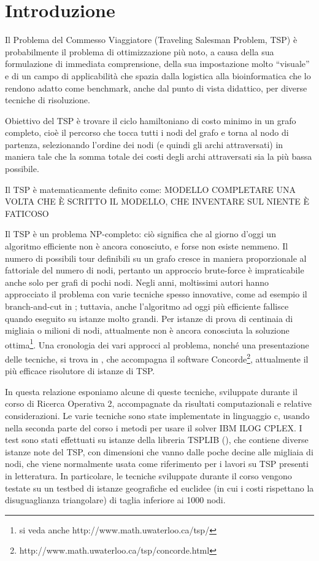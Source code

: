 \chapter{Introduzione}
Il Problema del Commesso Viaggiatore (Traveling Salesman Problem, TSP) è probabilmente il problema di ottimizzazione più noto, a causa della sua formulazione di immediata comprensione, della sua impostazione molto ``visuale'' e di un campo di applicabilità che spazia dalla logistica alla bioinformatica che lo rendono adatto come benchmark, anche dal punto di vista didattico, per diverse tecniche di risoluzione.

Obiettivo del TSP è trovare il ciclo hamiltoniano di costo minimo in un grafo completo, cioè il percorso che tocca tutti i nodi del grafo e torna al nodo di partenza, selezionando l'ordine dei nodi (e quindi gli archi attraversati) in maniera tale che la somma totale dei costi degli archi attraversati sia la più bassa possibile.

Il TSP è matematicamente definito come:
MODELLO
COMPLETARE UNA VOLTA CHE È SCRITTO IL MODELLO, CHE INVENTARE SUL NIENTE È FATICOSO

Il TSP è un problema NP-completo: ciò significa che al giorno d'oggi un algoritmo efficiente non è ancora conosciuto, e forse non esiste nemmeno. Il numero di possibili tour definibili su un grafo cresce in maniera proporzionale al fattoriale del numero di nodi, pertanto un approccio brute-force è impraticabile anche solo per grafi di pochi nodi. Negli anni, moltissimi autori hanno approcciato il problema con varie tecniche spesso innovative, come ad esempio il branch-and-cut in \citet*{padberg1991branch}; tuttavia, anche l'algoritmo ad oggi più efficiente fallisce quando eseguito su istanze molto grandi. Per istanze di prova di centinaia di migliaia o milioni di nodi, attualmente non è ancora conosciuta la soluzione ottima\footnote{si veda anche http://www.math.uwaterloo.ca/tsp/}. Una cronologia dei vari approcci al problema, nonché una presentazione delle tecniche, si trova in \citet*{applegate2011traveling}, che accompagna il software Concorde\footnote{http://www.math.uwaterloo.ca/tsp/concorde.html}, attualmente il più efficace risolutore di istanze di TSP.

In questa relazione esponiamo alcune di queste tecniche, sviluppate durante il corso di Ricerca Operativa 2, accompagnate da risultati computazionali e relative considerazioni. Le varie tecniche sono state implementate in linguaggio c, usando nella seconda parte del corso i metodi per usare il solver IBM ILOG CPLEX. I test sono stati effettuati su istanze della libreria TSPLIB (\citet*{reinelt1991tsplib}), che contiene diverse istanze note del TSP, con dimensioni che vanno dalle poche decine alle migliaia di nodi, che viene normalmente usata come riferimento per i lavori su TSP presenti in letteratura. In particolare, le tecniche sviluppate durante il corso vengono testate su un testbed di istanze geografiche ed euclidee (in cui i costi rispettano la disuguaglianza triangolare) di taglia inferiore ai 1000 nodi.

